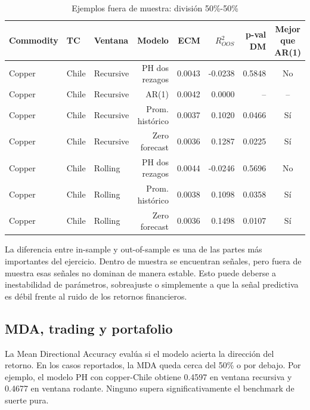 \documentclass[11pt,letterpaper]{article}
\begin{document}
\begin{table}[H]
\centering
\caption{Ejemplos fuera de muestra: división 50\%-50\%}
\scriptsize
\begin{tabular}{lllrrrrc}
\toprule
Commodity & TC & Ventana & Modelo & ECM & $R^2_{OOS}$ & p-val DM & Mejor que AR(1) \\
\midrule
Copper & Chile & Recursive & PH dos rezagos & 0.0043 & -0.0238 & 0.5848 & No \\
Copper & Chile & Recursive & AR(1) & 0.0042 & 0.0000 & -- & -- \\
Copper & Chile & Recursive & Prom. histórico & 0.0037 & 0.1020 & 0.0466 & Sí \\
Copper & Chile & Recursive & Zero forecast & 0.0036 & 0.1287 & 0.0225 & Sí \\
Copper & Chile & Rolling & PH dos rezagos & 0.0044 & -0.0246 & 0.5696 & No \\
Copper & Chile & Rolling & Prom. histórico & 0.0038 & 0.1098 & 0.0358 & Sí \\
Copper & Chile & Rolling & Zero forecast & 0.0036 & 0.1498 & 0.0107 & Sí \\
\bottomrule
\end{tabular}
\end{table}

La diferencia entre in-sample y out-of-sample es una de las partes más importantes del ejercicio. Dentro de muestra se encuentran señales, pero fuera de muestra esas señales no dominan de manera estable. Esto puede deberse a inestabilidad de parámetros, sobreajuste o simplemente a que la señal predictiva es débil frente al ruido de los retornos financieros.

\subsection{MDA, trading y portafolio}

La Mean Directional Accuracy evalúa si el modelo acierta la dirección del retorno. En los casos reportados, la MDA queda cerca del 50\% o por debajo. Por ejemplo, el modelo PH con copper-Chile obtiene 0.4597 en ventana recursiva y 0.4677 en ventana rodante. Ninguno supera significativamente el benchmark de suerte pura.
\end{document}
